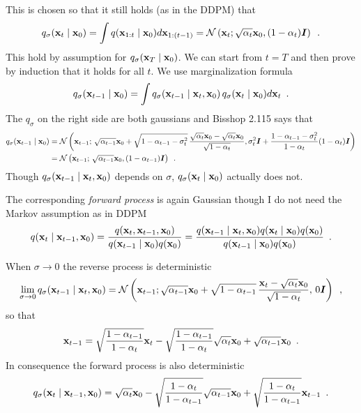 This is chosen so that it still holds (as in the DDPM) that
\begin{equation}
    q_{\sigma}({\mathbf{x}}_t \mid {\mathbf{x}}_0) = \int q({\mathbf{x}}_{1:t} \mid {\mathbf{x}}_0) d{\mathbf{x}}_{1:(t-1)} 
    = \mathcal{N} \left( {\mathbf{x}}_t;
    \sqrt{\alpha_t} {\mathbf{x}}_0,
    (1 - \alpha_t) {\bm{I}}
    \right) \enspace .
\end{equation}
This hold by assumption for $q_{\sigma}({\mathbf{x}}_T \mid {\mathbf{x}}_0)$. We can start from $t=T$ and then prove by induction that it holds for all $t$.
We use marginalization formula
\begin{equation}
    q_{\sigma}({\mathbf{x}}_{t-1} \mid {\mathbf{x}}_0) = \int q_\sigma({\mathbf{x}}_{t-1} \mid {\mathbf{x}}_t, {\mathbf{x}}_0) \, q_{\sigma}({\mathbf{x}}_{t} \mid {\mathbf{x}}_0) d {\mathbf{x}}_t \enspace .
\end{equation}
The $q_{\sigma}$ on the right side are both gaussians and Bisshop 2.115 says that
\begin{align}
    q_{\sigma}({\mathbf{x}}_{t-1} \mid {\mathbf{x}}_0) & = \mathcal{N} \left( {\mathbf{x}}_{t-1};\, \sqrt{\alpha_{t-1}}{\mathbf{x}}_0
    + \sqrt{1 - \alpha_{t-1} - \sigma_t^2} \, \frac{\sqrt{\alpha_t} {\mathbf{x}}_0 - \sqrt{\alpha_t}{\mathbf{x}}_0}{\sqrt{1-\alpha_t}}, \sigma_t^2 {\bm{I}}  + \frac{1 - \alpha_{t-1} - \sigma_t^2}{1-\alpha_t}(1 - \alpha_t) {\bm{I}}
    \right) \nonumber \\
    & = \mathcal{N} \left( {\mathbf{x}}_{t-1};\, \sqrt{\alpha_{t-1}}{\mathbf{x}}_0, (1 - \alpha_{t-1}) {\bm{I}}
    \right) \enspace .
\end{align}
Though $q_\sigma({\mathbf{x}}_{t-1} \mid {\mathbf{x}}_t, {\mathbf{x}}_0)$ depends on $\sigma$, $q_{\sigma}({\mathbf{x}}_t \mid {\mathbf{x}}_0)$ actually does not.

The corresponding \textit{forward process} is again Gaussian though I do not need the Markov assumption as in DDPM
\begin{equation}
    q({\mathbf{x}}_t \mid {\mathbf{x}}_{t-1}, {\mathbf{x}}_0)
    = \frac{q({\mathbf{x}}_t, {\mathbf{x}}_{t-1}, {\mathbf{x}}_0)}{q({\mathbf{x}}_{t-1} \mid {\mathbf{x}}_0) q({\mathbf{x}}_0)}
    = \frac{q({\mathbf{x}}_{t-1} \mid {\mathbf{x}}_{t}, {\mathbf{x}}_0) q({\mathbf{x}}_{t} \mid {\mathbf{x}}_0) q({\mathbf{x}}_0)}{q({\mathbf{x}}_{t-1} \mid {\mathbf{x}}_0) q({\mathbf{x}}_0)} \enspace .
\end{equation}

When $\sigma \to 0$ the reverse process is deterministic
\begin{equation}
    \lim_{\sigma \to 0} q_\sigma({\mathbf{x}}_{t-1} \mid {\mathbf{x}}_t, {\mathbf{x}}_0) 
    = \mathcal{N} \left( {\mathbf{x}}_{t-1};
    \sqrt{\alpha_{t-1}}{\mathbf{x}}_0
    + \sqrt{1 - \alpha_{t-1}} \, \frac{{\mathbf{x}}_t - \sqrt{\alpha_t}{\mathbf{x}}_0}{\sqrt{1-\alpha_t}}, \, 0 {\bm{I}}
    \right) \enspace ,
\end{equation}
so that
\begin{equation}
    {\mathbf{x}}_{t-1} = \sqrt{\frac{1 - \alpha_{t-1}}{1-\alpha_t}}{\mathbf{x}}_t 
    - \sqrt{\frac{1 - \alpha_{t-1}}{1-\alpha_t}} \sqrt{\alpha_t}{\mathbf{x}}_0 
    + \sqrt{\alpha_{t-1}}{\mathbf{x}}_0 \enspace .
\end{equation}
In consequence the forward process is also deterministic
\begin{equation}
    q_{\sigma}({\mathbf{x}}_t \mid {\mathbf{x}}_{t-1}, {\mathbf{x}}_0) = \sqrt{\alpha_t}{\mathbf{x}}_0 - \sqrt{\frac{1-\alpha_t}{1 - \alpha_{t-1}}} \sqrt{\alpha_{t-1}}{\mathbf{x}}_0 + \sqrt{\frac{1-\alpha_t}{1 - \alpha_{t-1}}} {\mathbf{x}}_{t-1} \enspace .
\end{equation}

